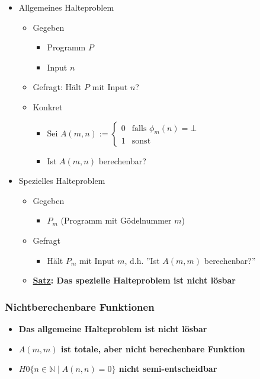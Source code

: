 \documentclass{scrartcl}
\begin{document}
\begin{itemize}
	\item Allgemeines Halteproblem
	\begin{itemize}
		\item Gegeben
		\begin{itemize}
			\item Programm $P$
			\item Input $n$
		\end{itemize}
		\item Gefragt: Hält $P$ mit Input $n$?
		\item Konkret
		\begin{itemize}
			\item Sei $A(m,n) := \begin{cases}
				0 & \text{falls } \phi_m(n) = \bot \\
				1 & \text{sonst}
			\end{cases}$
			\item Ist $A(m,n)$ berechenbar?
		\end{itemize}
	\end{itemize}
	\item Spezielles Halteproblem
	\begin{itemize}
		\item Gegeben
		\begin{itemize}
			\item $P_m$ (Programm mit Gödelnummer $m$)
		\end{itemize}
		\item Gefragt
		\begin{itemize}
			\item Hält $P_m$ mit Input $m$, d.h. ''Ist $A(m,m)$ berechenbar?''
		\end{itemize}
		\item \textbf{\underline{Satz}: Das spezielle Halteproblem ist nicht lösbar}
	\end{itemize}
\end{itemize}

\subsubsection{Nichtberechenbare Funktionen}

\begin{itemize}
	\item \textbf{Das allgemeine Halteproblem ist nicht lösbar}
	\item \textbf{$A(m,m)$ ist totale, aber nicht berechenbare Funktion}
	\item \textbf{$H 0 \{ n \in \mathbb{N} \mid A(n,n) = 0 \}$ nicht semi-entscheidbar}
\end{itemize}
\end{document}
